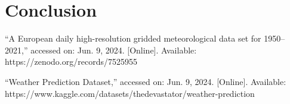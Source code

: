 \documentclass[conference]{IEEEtran}
\begin{document}
\section{Conclusion}



\begin{thebibliography}{1}

``A European daily high-resolution gridded meteorological data set for 1950–2021,'' accessed on: Jun. 9, 2024. [Online]. Available: https://zenodo.org/records/7525955

``Weather Prediction Dataset,'' accessed on: Jun. 9, 2024. [Online]. Available: https://www.kaggle.com/datasets/thedevastator/weather-prediction

\end{thebibliography}
\end{document}
